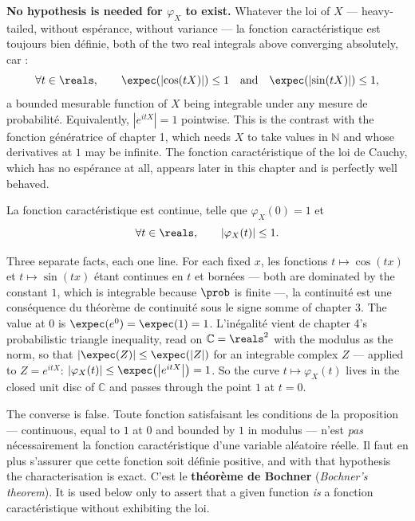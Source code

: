\begin{remark}
\textbf{No hypothesis is needed for $\varphi_{X}$ to exist.} Whatever the loi of $X$ ---
heavy-tailed, without espérance, without variance --- la fonction caractéristique est
toujours bien définie, both of the two real integrals above converging absolutely, car :
\[
  \forall t \in \reals, \qquad \expec\!\left(\left|\cos(tX)\right|\right) \leq 1 \quad
  \text{and} \quad \expec\!\left(\left|\sin(tX)\right|\right) \leq 1,
\]
a bounded mesurable function of $X$ being integrable under any mesure de probabilité.
Equivalently, $\left|e^{itX}\right| = 1$ pointwise. This is the contrast with the fonction
génératrice of chapter 1, which needs $X$ to take values in $\mathbb{N}$ and whose derivatives
at $1$ may be infinite. The fonction caractéristique of the loi de Cauchy, which has no
espérance at all, appears later in this chapter and is perfectly well behaved.
\end{remark}

\begin{prop}
La fonction caractéristique est continue, telle que $\varphi_{X}(0) = 1$ et
\[
  \forall t \in \reals, \qquad \left|\varphi_{X}(t)\right| \leq 1.
\]
\end{prop}

\begin{remark}
Three separate facts, each one line. For each fixed $x$, les fonctions $t
\mapsto \cos(tx)$ et $t \mapsto \sin(tx)$ étant continues en $t$ et bornées --- both are
dominated by the constant $1$, which is integrable because $\prob$ is finite ---, la
continuité est une conséquence du théorème de continuité sous le signe somme of chapter 3.
The value at $0$ is
$\expec(e^{0}) = \expec(1) = 1$. L'inégalité vient de chapter 4's probabilistic triangle
inequality, read on
$\mathbb{C} = \reals^{2}$ with the modulus as the norm, so that
$|\expec(Z)| \leq \expec(|Z|)$ for an integrable complex $Z$ --- applied to $Z = e^{itX}$:
$\left|\varphi_{X}(t)\right| \leq \expec\!\left(\left|e^{itX}\right|\right) = 1$. So the
curve $t \mapsto \varphi_{X}(t)$ lives in the closed unit disc of $\mathbb{C}$ and passes
through the point $1$ at $t = 0$.
\end{remark}

\begin{remark}
The converse is false. Toute fonction satisfaisant les conditions de la proposition ---
continuous, equal to $1$ at $0$ and bounded by $1$ in modulus --- n'est \emph{pas}
nécessairement la fonction caractéristique d'une variable aléatoire réelle. Il faut en plus
s'assurer que cette fonction soit définie positive, and with that hypothesis the
characterisation is exact. C'est le \textbf{théorème de Bochner} (\textit{Bochner's theorem}).
It is used below only to assert that a given function \emph{is} a fonction caractéristique
without exhibiting the loi.
\end{remark}

